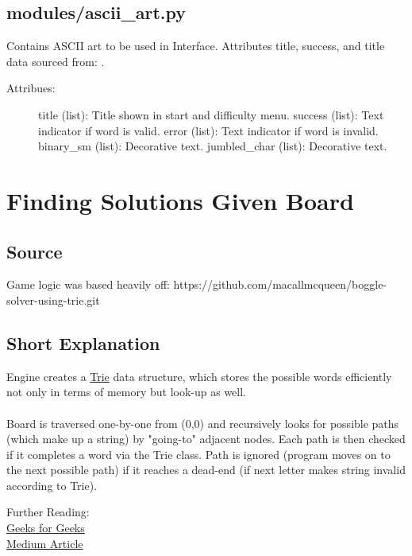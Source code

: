 \documentclass[letterpaper,10pt,english]{sphinxmanual}
\begin{document}
\section{modules/ascii\_art.py}
\label{\detokenize{index:modules-ascii-art-py}}

\begin{fulllineitems}
Contains ASCII art to be used in Interface. Attributes title,
success, and title data sourced from: .
\begin{description}
\item[{Attribues:}] \leavevmode
title (list): Title shown in start and difficulty menu.
success (list): Text indicator if word is valid.
error (list): Text indicator if word is invalid.
binary\_sm (list): Decorative text.
jumbled\_char (list): Decorative text.

\end{description}

\end{fulllineitems}

\chapter{Finding Solutions Given Board}

\section{Source} 
\begin{fulllineitems}
Game logic was based heavily off: https://github.com/macallmcqueen/boggle-solver-using-trie.git
\end{fulllineitems}

\section{Short Explanation}
\begin{fulllineitems}
Engine creates a \href{https://en.wikipedia.org/wiki/Trie}{Trie} data structure, which stores the possible words efficiently not only in terms of memory but look-up as well. \\ \\
Board is traversed one-by-one from (0,0) and recursively looks for possible paths (which make up a string) by "going-to" adjacent nodes. Each path is then checked if it completes a word via the Trie class. Path is ignored (program moves on to the next possible path) if it reaches a dead-end (if next letter makes string invalid according to Trie).
\end{fulllineitems}
\begin{fulllineitems}
\item{Further Reading:}\\
\href{https://www.geeksforgeeks.org/trie-insert-and-search/}{Geeks for Geeks}\\
\href{https://medium.com/basecs/trying-to-understand-tries-3ec6bede0014}{Medium Article}
\end{fulllineitems}

\renewcommand{\indexname}{Index}
\printindex
\end{document}
